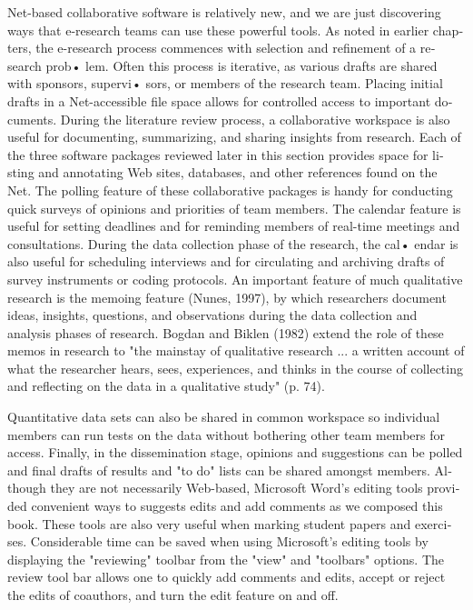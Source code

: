 \documentclass[a4paper,12pt]{article}
\begin{document}
\begin{latin}
\vspace{0.1cm}
\vspace{0.1cm}
\vspace{0.1cm}
 Net-based collaborative  software  is  relatively new, and we are just discovering ways  that e-research teams can use these powerful  tools. As noted in earlier  chapters, the e-research  process commences  with selection  and refinement of a research  prob• lem. Often this process is iterative, as various drafts are shared with sponsors, supervi• sors, or members of the research  team. Placing  initial drafts in a Net-accessible file space  allows  for  controlled access to  important documents.  During the  literature review process, a collaborative workspace is also useful for documenting, summarizing, and sharing insights from research. Each of the three software packages reviewed later in this section provides space for listing and annotating Web sites, databases, and other references found  on the Net. The polling  feature of these  collaborative  packages  is handy for conducting quick surveys of opinions  and priorities of team members. The calendar feature is useful for setting deadlines and for reminding members of real-time meetings and consultations. During  the data collection  phase of the research,  the cal• endar is also useful for scheduling interviews and for circulating and archiving drafts of survey instruments or coding  protocols. An important feature of much  qualitative research is the memoing  feature (Nunes,  1997), by which researchers document ideas, insights, questions, and observations  during  the data collection  and analysis phases of research. Bogdan and Biklen (1982) extend the role of these memos in research to "the mainstay  of qualitative research  ... a written account  of what  the  researcher hears, sees, experiences, and thinks in the course of collecting  and reflecting  on the data in a qualitative study" (p.  74).  

 \vspace{0.1cm}
\vspace{0.1cm}
\vspace{0.1cm}          
Quantitative data sets can also be shared in common  workspace  so individual members can run tests on the data without  bothering other  team members for access. Finally, in the dissemination  stage, opinions  and suggestions can be polled  and final drafts  of results and "to do" lists can be shared amongst  members. Although  they are not necessarily Web-based, Microsoft  Word's editing tools provided  convenient ways to suggests  edits  and add comments  as we composed  this book.  These tools are  also very useful when marking student papers and exercises. Considerable time can be saved when using Microsoft's editing  tools by displaying  the "reviewing" toolbar  from the "view" and "toolbars" options. The review tool bar allows one to quickly add comments and edits, accept or reject the edits of coauthors, and turn the edit feature on and off.
 \vspace{0.1cm}
\vspace{0.1cm}



\end{latin}
\end{document}
